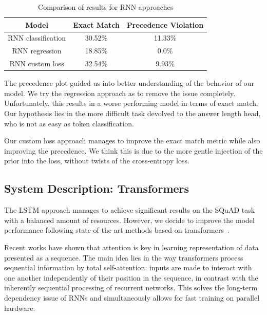 \documentclass{article}
\begin{document}
\begin{table}[h]
\centering
\caption{Comparison of results for RNN approaches}\label{tab1}

\begin{tabular}{| c | c | c |}
\hline
Model &  Exact Match & Precedence Violation\\
\hline
RNN classification &  30.52\% & 11.33\%\\

\hline
RNN regression &  18.85\% & 0.0\%\\

\hline
RNN custom loss &  32.54\% & 9.93\%\\

\hline
\end{tabular}
\end{table}

The precedence plot guided us into better understanding of the behavior of our model.
We try the regression approach as to remove the issue completely.
Unfortunately, this results in a worse performing model in terms of exact match.
Our hypothesis lies in the more difficult task devolved to the answer length head, who is not as easy as token classification.

Our custom loss approach manages to improve the exact match metric while also improving the precedence.
We think this is due to the more gentle injection of the prior into the loss, without twists of the cross-entropy loss.

\pagebreak

\subsection{System Description: Transformers}
The LSTM approach manages to achieve significant results on the SQuAD task with a balanced amount of resources.
However, we decide to improve the model performance following state-of-the-art methods based on transformers~\cite{vaswani2017attention}.

Recent works have shown that attention is key in learning representation of data presented as a sequence. 
The main idea lies in the way transformers process sequential information by total self-attention: inputs are made to interact with one another independently of their position in the sequence, in contrast with the inherently sequential processing of recurrent networks.
This solves the long-term dependency issue of RNNs and simultaneously allows for fast training on parallel hardware.
\end{document}
